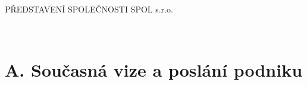 \maketitle
\thispagestyle{fancy}
	
\begin{lefttextpipe}
	{\huge PŘEDSTAVENÍ SPOLEČNOSTI SPOL s.r.o.}
\end{lefttextpipe}

\lipsum[1]\\

\lipsum[1]

\section*{A. Současná vize a poslání podniku}